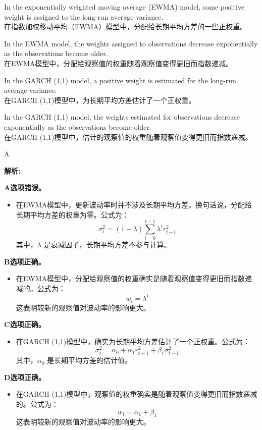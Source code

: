 \documentclass{article}
\newenvironment{explanation}
{\textbf{解析:}\par}
{\par}
\begin{document}
\begin{choices}
    \item In the exponentially weighted moving average (EWMA) model, some positive weight is assigned to the long-run average variance.\\
    在指数加权移动平均（EWMA）模型中，分配给长期平均方差的一些正权重。
    \item In the EWMA model, the weights assigned to observations decrease exponentially as the observations become older.\\
    在EWMA模型中，分配给观察值的权重随着观察值变得更旧而指数递减。
    \item In the GARCH (1,1) model, a positive weight is estimated for the long-run average variance.\\
    在GARCH (1,1)模型中，为长期平均方差估计了一个正权重。
    \item In the GARCH (1,1) model, the weights estimated for observations decrease exponentially as the observations become older.\\
    在GARCH (1,1)模型中，估计的观察值的权重随着观察值变得更旧而指数递减。
\end{choices}

\begin{correctanswer}
    A
\end{correctanswer}

\begin{explanation}
    \textbf{A选项错误。} 
    \begin{itemize}
        \item 在EWMA模型中，更新波动率时并不涉及长期平均方差。换句话说，分配给长期平均方差的权重为零。公式为：
        \[
        \sigma_t^2 = (1 - \lambda) \sum_{i=0}^{t-1} \lambda^i r_{t-i}^2
        \]
        其中，\(\lambda\) 是衰减因子，长期平均方差不参与计算。
    \end{itemize}
    
    \textbf{B选项正确。} 
    \begin{itemize}
        \item 在EWMA模型中，分配给观察值的权重确实是随着观察值变得更旧而指数递减的。公式为：
        \[
        w_i = \lambda^i
        \]
        这表明较新的观察值对波动率的影响更大。
    \end{itemize}
    
    \textbf{C选项正确。} 
    \begin{itemize}
        \item 在GARCH (1,1)模型中，确实为长期平均方差估计了一个正权重。公式为：
        \[
        \sigma_t^2 = \alpha_0 + \alpha_1 r_{t-1}^2 + \beta_1 \sigma_{t-1}^2
        \]
        其中，\(\alpha_0\) 是长期平均方差的估计值。
    \end{itemize}
    
    \textbf{D选项正确。} 
    \begin{itemize}
        \item 在GARCH (1,1)模型中，观察值的权重确实是随着观察值变得更旧而指数递减的。公式为：
        \[
        w_i = \alpha_1 + \beta_1
        \]
        这表明较新的观察值对波动率的影响更大。
    \end{itemize}
\end{explanation}
\end{document}
